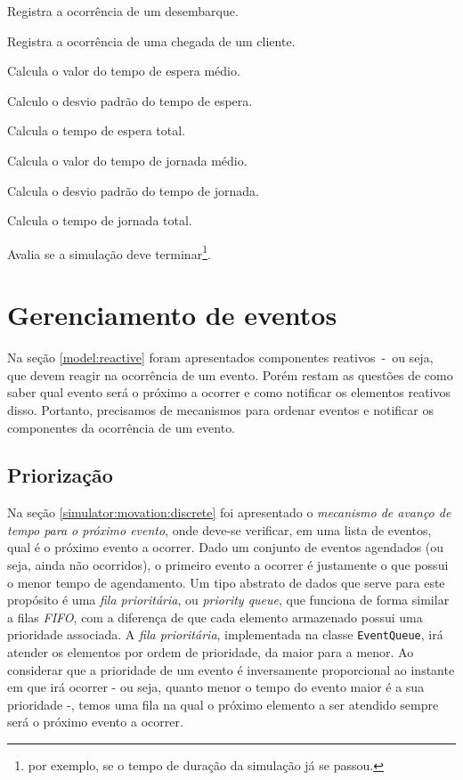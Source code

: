 \begin{description}
    \begin{description}[leftmargin=!,labelwidth=\widthof{\bfseries destinationFloor}]
      \item[\texttt{logDropOff}] Registra a ocorrência de um desembarque.
      \item[\texttt{logTrip}] Registra a ocorrência de uma chegada de um cliente.
      \item[\texttt{getAvgWT}] Calcula o valor do tempo de espera médio.
      \item[\texttt{getDevWt}] Calculo o desvio padrão do tempo de espera.
      \item[\texttt{getTotalWT}] Calcula o tempo de espera total.
      \item[\texttt{getAvgWT}] Calcula o valor do tempo de jornada médio.
      \item[\texttt{getDevWt}] Calcula o desvio padrão do tempo de jornada.
      \item[\texttt{getTotalWT}] Calcula o tempo de jornada total.
      \item[\texttt{keepRunning}] Avalia se a simulação deve terminar\footnote{por exemplo, se o tempo de duração da simulação já se passou.}.
    \end{description}
\end{description}

\section{\label{sec:model:event}Gerenciamento de eventos}

Na seção \ref{model:reactive} foram apresentados componentes reativos~-~ou seja,
que devem reagir na ocorrência de um evento. Porém restam as questões de como
saber qual evento será o próximo a ocorrer e como notificar os elementos
reativos disso. Portanto, precisamos de mecanismos para ordenar eventos e
notificar os componentes da ocorrência de um evento.

\subsection{Priorização}

Na seção \ref{simulator:movation:discrete} foi apresentado o \textit{mecanismo
de avanço de tempo para o próximo evento}, onde deve-se verificar, em uma lista
de eventos, qual é o próximo evento a ocorrer. Dado um conjunto de eventos
agendados (ou seja, ainda não ocorridos), o primeiro evento a ocorrer é
justamente o que possui o menor tempo de agendamento. Um tipo abstrato de dados
que serve para este propósito é uma \textit{fila prioritária}, ou
\textit{priority queue}, que funciona de forma similar a filas \textit{FIFO},
com a diferença de que cada elemento armazenado possui uma prioridade associada.
A \textit{fila prioritária}, implementada na classe \texttt{EventQueue}, irá
atender os elementos por ordem de prioridade, da maior para a menor. Ao
considerar que a prioridade de um evento é inversamente proporcional ao instante
em que irá ocorrer - ou seja, quanto menor o tempo do evento maior é a sua
prioridade -, temos uma fila na qual o próximo elemento a ser atendido sempre
será o próximo evento a ocorrer.

